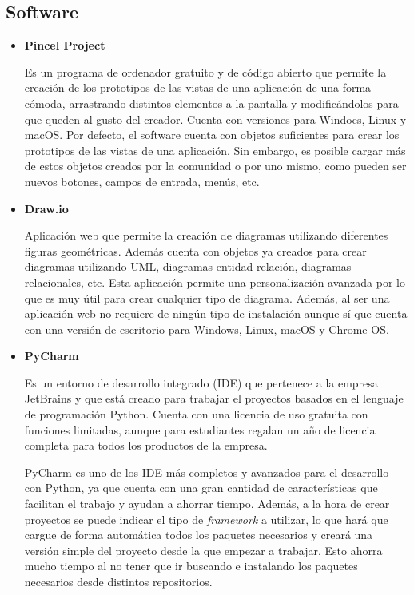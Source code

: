 \subsection{Software}
\begin{itemize}
\item\textbf{Pincel Project}

Es un programa de ordenador gratuito y de código abierto que permite la creación de los prototipos de las vistas de una aplicación de una forma cómoda, arrastrando distintos elementos a la pantalla y modificándolos para que queden al gusto del creador. 
Cuenta con versiones para Windoes, Linux y macOS.
Por defecto, el software cuenta con objetos suficientes para crear los prototipos de las vistas de una aplicación. 
Sin embargo, es posible cargar más de estos objetos creados por la comunidad o por uno mismo, como pueden ser nuevos botones, campos de entrada, menús, etc.

\item\textbf{Draw.io}

Aplicación web que permite la creación de diagramas utilizando diferentes figuras geométricas. 
Además cuenta con objetos ya creados para crear diagramas utilizando UML, diagramas entidad-relación, diagramas relacionales, etc. 
Esta aplicación permite una personalización avanzada por lo que es muy útil para crear cualquier tipo de diagrama. 
Además, al ser una aplicación web no requiere de ningún tipo de instalación aunque sí que cuenta con una versión de escritorio para Windows, Linux, macOS y Chrome OS.

\item\textbf{PyCharm}

Es un entorno de desarrollo integrado (IDE) que pertenece a la empresa JetBrains y que está creado para trabajar el proyectos basados en el lenguaje de programación Python. 
Cuenta con una licencia de uso gratuita con funciones limitadas, aunque para estudiantes regalan un año de licencia completa para todos los productos de la empresa.

PyCharm es uno de los IDE más completos y avanzados para el desarrollo con Python, ya que cuenta con una gran cantidad de características que facilitan el trabajo y ayudan a ahorrar tiempo. 
Además, a la hora de crear proyectos se puede indicar el tipo de \textit{framework} a utilizar, lo que hará que cargue de forma automática todos los paquetes necesarios y creará una versión simple del proyecto desde la que empezar a trabajar. 
Esto ahorra mucho tiempo al no tener que ir buscando e instalando los paquetes necesarios desde distintos repositorios.


\end{itemize}
